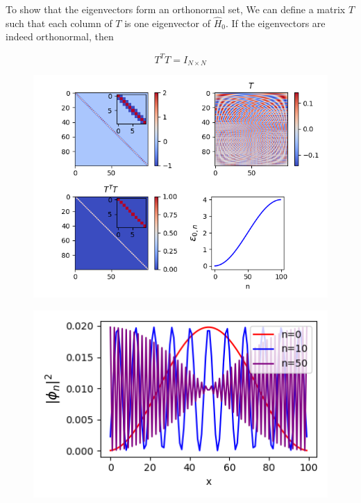 \documentclass[paper=a4, fontsize=11pt]{scrartcl}
\numberwithin{equation}{section}		%
\numberwithin{figure}{section}			%
\numberwithin{table}{section}				%
\begin{document}
To show that the eigenvectors form an orthonormal set, We can define a matrix $T$ such that each column of $T$ is one eigenvector of $\hat{H}_{0}$. If the eigenvectors are indeed orthonormal, then

\begin{equation*}
T^{T}T = I_{N\times N}
\end{equation*}

\begin{figure}
\includegraphics[width=14cm]{p1_1.png}
\caption{}
\end{figure}

\begin{figure}
\includegraphics[width=14cm]{p1_2.png}
\caption{}
\end{figure}
\end{document}
